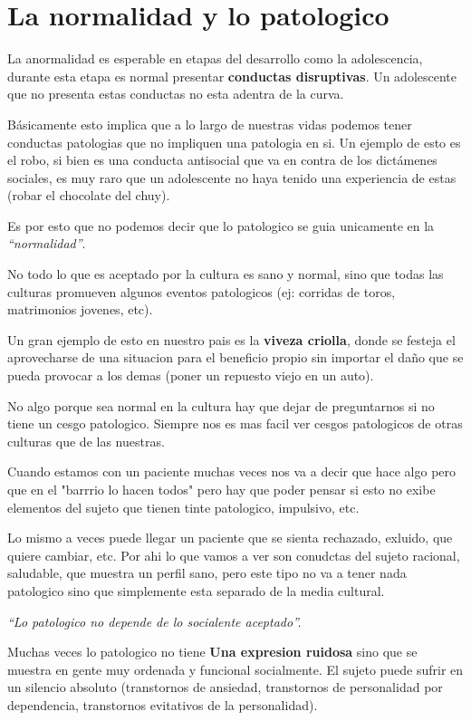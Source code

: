 \documentclass[12pt,a4paper]{article}
\begin{document}
\section{La normalidad y lo patologico}%
\label{sec:la_normalidad_y_lo_patologico}

La anormalidad es esperable en etapas del desarrollo como la adolescencia,
durante esta etapa es normal presentar \textbf{conductas disruptivas}. Un
adolescente que no presenta estas conductas no esta adentra de la curva.

Básicamente esto implica que a lo largo de nuestras vidas podemos tener
conductas patologias que no impliquen una patologia en si. Un ejemplo de
esto es el robo, si bien es una conducta antisocial que va en contra de
los dictámenes sociales, es muy raro que un adolescente no haya tenido una
experiencia de estas (robar el chocolate del chuy). 

Es por esto que no podemos decir que lo patologico se guia unicamente en
la \textit{\enquote{normalidad}}. 


No todo lo que es aceptado por la cultura es sano y normal, sino que todas
las culturas promueven algunos eventos patologicos (ej: corridas de toros,
matrimonios jovenes, etc). 

Un gran ejemplo de esto en nuestro pais es la \textbf{viveza criolla}, donde se festeja el aprovecharse de una situacion para el beneficio propio sin
importar el daño que se pueda provocar a los demas (poner un repuesto
viejo en un auto).

No algo porque sea normal en la cultura hay que dejar de preguntarnos si
no tiene un cesgo patologico. Siempre nos es mas facil ver cesgos
patologicos de otras culturas que de las nuestras. 

Cuando estamos con un paciente muchas veces nos va a decir que hace algo
pero que en el "barrrio lo hacen todos" pero hay que poder pensar si esto
no exibe elementos del sujeto que tienen tinte patologico, impulsivo, etc. 

Lo mismo a veces puede llegar un paciente que se sienta rechazado,
exluido, que quiere cambiar, etc. Por ahi lo que vamos a ver son conudctas
del sujeto racional, saludable, que muestra un perfil sano, pero este tipo
no va a tener nada patologico sino que simplemente esta separado de la
media cultural. 

\textit{``Lo patologico no depende de lo socialente aceptado''.}

Muchas veces lo patologico no tiene \textbf{Una expresion ruidosa} sino que se muestra en gente muy ordenada y funcional socialmente. El sujeto puede
sufrir en un silencio absoluto (transtornos de ansiedad, transtornos de
personalidad por dependencia, transtornos evitativos de la personalidad). 
\end{document}
